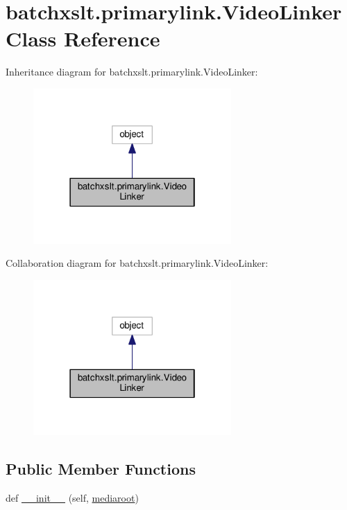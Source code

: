 \hypertarget{classbatchxslt_1_1primarylink_1_1_video_linker}{}\section{batchxslt.\+primarylink.\+Video\+Linker Class Reference}
\label{classbatchxslt_1_1primarylink_1_1_video_linker}


Inheritance diagram for batchxslt.\+primarylink.\+Video\+Linker\+:
\nopagebreak
\begin{figure}[H]
\begin{center}
\leavevmode
\includegraphics[width=214pt]{da/daa/classbatchxslt_1_1primarylink_1_1_video_linker__inherit__graph}
\end{center}
\end{figure}


Collaboration diagram for batchxslt.\+primarylink.\+Video\+Linker\+:
\nopagebreak
\begin{figure}[H]
\begin{center}
\leavevmode
\includegraphics[width=214pt]{dc/d00/classbatchxslt_1_1primarylink_1_1_video_linker__coll__graph}
\end{center}
\end{figure}
\subsection*{Public Member Functions}
\begin{DoxyCompactItemize}
\item 
def \hyperlink{classbatchxslt_1_1primarylink_1_1_video_linker_abaa9c1a4ed457bf9ed577d8cb4e406bf}{\+\_\+\+\_\+init\+\_\+\+\_\+} (self, \hyperlink{classbatchxslt_1_1primarylink_1_1_video_linker_a4fbfab2aa675d0721371c723268f285f}{mediaroot})
\end{DoxyCompactItemize}
